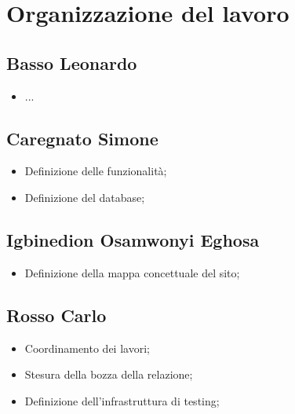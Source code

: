 \section{Organizzazione del lavoro}

\subsection{Basso Leonardo}
\begin{itemize}
    \item ...
\end{itemize}

\subsection{Caregnato Simone}
\begin{itemize}
    \item Definizione delle funzionalità;
    \item Definizione del database;
\end{itemize}

\subsection{Igbinedion Osamwonyi Eghosa}
\begin{itemize}
    \item Definizione della mappa concettuale del sito;
\end{itemize}

\subsection{Rosso Carlo}
\begin{itemize}
    \item Coordinamento dei lavori;
    \item Stesura della bozza della relazione;
    \item Definizione dell'infrastruttura di testing;
\end{itemize}

